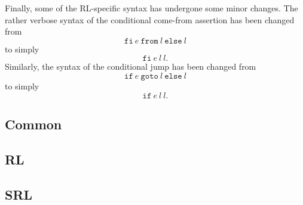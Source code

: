 \noindent Finally, some of the RL-specific syntax has undergone some minor changes. The rather verbose syntax of the conditional come-from assertion has been changed from
\[\texttt{fi} \ e \ \texttt{from} \ l \ \texttt{else} \ l\]
\noindent to simply
\[\texttt{fi} \ e \ l \ l.\]
\noindent Similarly, the syntax of the conditional jump has been changed from
\[\texttt{if} \ e \ \texttt{goto} \ l \ \texttt{else} \ l\]
\noindent to simply
\[\texttt{if} \ e \ l \ l.\]

\subsection{Common}

\subsection{RL}

\subsection{SRL}
